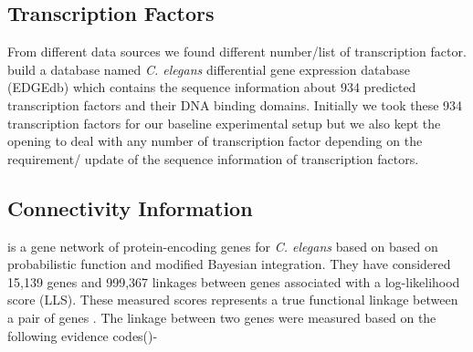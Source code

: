 \subsection{Transcription Factors}
From different data sources we found different number/list of transcription factor. \cite{Inmaculada:2007} 
build a database named \textit{C. elegans} differential gene expression database 
(EDGEdb) which contains the sequence information about 934 predicted transcription factors and
their DNA binding domains. Initially we took these 934 transcription factors for our baseline experimental setup
but we also kept the opening to deal with any number of transcription factor depending on the requirement/ 
update of the sequence information of transcription factors.

\subsection{Connectivity Information}
\cite{WormNet} is a gene network of protein-encoding genes for \textit{C. elegans} based on based on probabilistic function
and modified Bayesian integration. They have considered 15,139 genes and 999,367 linkages between genes 
associated with a log-likelihood score (LLS). These measured scores represents a true functional linkage between a pair 
of genes \cite{Lee:2007}.
The linkage between two genes were measured based on the following evidence codes(\cite{WormNet})-
